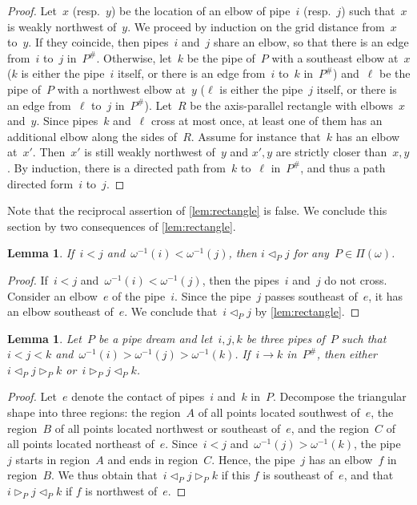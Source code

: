 \documentclass{amsart}
\newtheorem{lemma}[theorem]{Lemma}
\theoremstyle{definition}
\newcommand{\pipeDreams}{\Pi} %
\newcommand{\contact}{^\#} %
\newcommand{\less}{\vartriangleleft} %
\newcommand{\more}{\vartriangleright} %
\newcommand{\contactLess}[1]{\less_{#1}} %
\newcommand{\contactMore}[1]{\more_{#1}} %
\begin{document}
\begin{proof}
Let~$x$ (resp.~$y$) be the location of an elbow of pipe~$i$ (resp.~$j$) such that~$x$ is weakly northwest of~$y$.
We proceed by induction on the grid distance from~$x$ to~$y$.
If they coincide, then pipes~$i$ and~$j$ share an elbow, so that there is an edge from~$i$ to~$j$ in~$P\contact$.
Otherwise, let~$k$ be the pipe of~$P$ with a southeast elbow at~$x$ ($k$ is either the pipe~$i$ itself, or there is an edge from~$i$ to~$k$ in~$P\contact$) and~$\ell$ be the pipe of~$P$ with a northwest elbow at~$y$ ($\ell$ is either the pipe~$j$ itself, or there is an edge from~$\ell$ to~$j$ in~$P\contact$).
Let~$R$ be the axis-parallel rectangle with elbows~$x$ and~$y$.
Since pipes~$k$ and~$\ell$ cross at most once, at least one of them has an additional elbow along the sides of~$R$.
Assume for instance that~$k$ has an elbow at~$x'$.
Then~$x'$ is still weakly northwest of~$y$ and $x',y$ are strictly closer than~$x,y$.
By induction, there is a directed path from~$k$ to~$\ell$ in~$P\contact$, and thus a path directed form~$i$ to~$j$.
\end{proof}

Note that the reciprocal assertion of \cref{lem:rectangle} is false.
We conclude this section by two consequences of \cref{lem:rectangle}.

\begin{lemma}
\label{lem:consequenceRectangle1}
If~$i < j$ and~$\omega^{-1}(i) < \omega^{-1}(j)$, then $i \contactLess{P} j$ for any~$P \in \pipeDreams(\omega)$.
\end{lemma}

\begin{proof}
If~$i < j$ and~$\omega^{-1}(i) < \omega^{-1}(j)$, then the pipes~$i$ and~$j$ do not cross.
Consider an elbow~$e$ of the pipe~$i$.
Since the pipe~$j$ passes southeast of~$e$, it has an elbow southeast of~$e$.
We conclude that~$i \contactLess{P} j$ by \cref{lem:rectangle}.
\end{proof}

\begin{lemma}
\label{lem:consequenceRectangle2}
Let~$P$ be a pipe dream and let~$i,j,k$ be three pipes of~$P$ such that~$i < j < k$ and~$\omega^{-1}(i) > \omega^{-1}(j) > \omega^{-1}(k)$.
If~$i \to k$ in~$P\contact$, then either~$i \contactLess{P} j \contactMore{P} k$ or~$i \contactMore{P} j \contactLess{P} k$.
\end{lemma}

\begin{proof}
Let~$e$ denote the contact of pipes~$i$ and~$k$ in~$P$.
Decompose the triangular shape into three regions: the region~$A$ of all points located southwest of~$e$, the region~$B$ of all points located northwest or southeast of~$e$, and the region~$C$ of all points located northeast of~$e$.
Since~$i < j$ and~$\omega^{-1}(j) > \omega^{-1}(k)$, the pipe~$j$ starts in region~$A$ and ends in region~$C$.
Hence, the pipe~$j$ has an elbow~$f$ in region~$B$.
We thus obtain that~$i \contactLess{P} j \contactMore{P} k$ if this $f$ is southeast of~$e$, and that~$i \contactMore{P} j \contactLess{P} k$ if $f$ is northwest of~$e$.
\end{proof}
\end{document}
